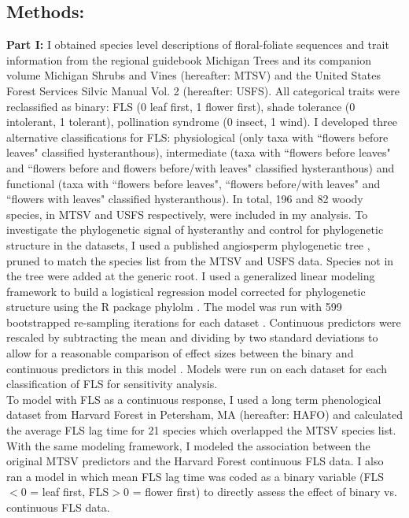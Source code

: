 \documentclass[12pt]{article}\usepackage[]{graphicx}\usepackage[]{color}
\begin{document}
\subsection*{Methods:}
\indent\indent\textbf{Part I:} I obtained species level descriptions of floral-foliate sequences and trait information from the regional guidebook Michigan Trees \citep{Barnes2004} and its companion volume Michigan Shrubs and Vines \citep{Barnes2016} (hereafter: MTSV) and the United States Forest Services Silvic Manual Vol. 2 \citep{Burns1990} (hereafter: USFS). All categorical traits were reclassified as binary: FLS (0 leaf first, 1 flower first), shade tolerance (0 intolerant, 1 tolerant), pollination syndrome (0 insect, 1 wind). I developed three alternative classifications for FLS: physiological (only taxa with ``flowers before leaves" classified hysteranthous), intermediate (taxa with ``flowers before leaves" and ``flowers before and flowers before/with leaves" classified hysteranthous) and functional (taxa with ``flowers before leaves", ``flowers before/with leaves" and ``flowers with leaves" classified hysteranthous). In total, 196 and 82 woody species, in MTSV and USFS respectively, were included in my analysis. To investigate the phylogenetic signal of hysteranthy and control for phylogenetic structure in the datasets, I used a published angiosperm phylogenetic tree \citep{Zanne2013}, pruned to match the species list from the MTSV and USFS data. Species not in the tree were added at the generic root. I used  a generalized linear modeling framework \citep{Ives2010} to build a logistical regression model corrected for phylogenetic structure using the R package phylolm \citep{Ho2014}. The model was run with 599 bootstrapped re-sampling iterations for each dataset \citep{Wilcox2010}. Continuous predictors were rescaled by subtracting the mean and dividing by two standard deviations to allow for a reasonable comparison of effect sizes between the binary and continuous predictors in this model \citep{Gelman2007}. Models were run on each dataset for each classification of FLS for sensitivity analysis.\\ 
\indent To model with FLS as a continuous response, I used a long term phenological dataset from Harvard Forest in Petersham, MA \citep{Okeefe2015} (hereafter: HAFO)  and calculated the average FLS lag time for 21 species which overlapped the MTSV species list. With the same modeling framework, I modeled the association between the original MTSV predictors and the Harvard Forest continuous FLS data. I also ran a model in which mean FLS lag time was coded as a binary variable (FLS$<0$ = leaf first, FLS$>0$ = flower first) to directly assess the effect of binary vs. continuous FLS data.\\
\end{document}
